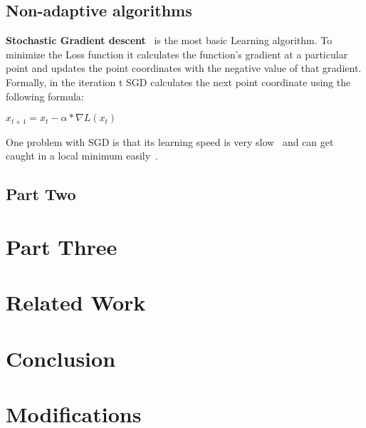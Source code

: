 \documentclass[sigconf]{acmart}
\begin{document}
\subsection{Non-adaptive algorithms}
\textbf{Stochastic Gradient descent}~\cite{kiefer1952} is the most basic Learning algorithm. To minimize the Loss function it calculates the function's gradient at a particular point and updates the point coordinates with the negative value of that gradient.
Formally, in the iteration t SGD calculates the next point coordinate using the following formula:
\begin{center}
    $x_{t+1} = x_t -\alpha * \nabla L(x_t)$
\end{center}
One problem with SGD is that its learning speed is very slow~\cite{SGDSlow} and can get caught in a local minimum easily~\cite{SGDLocalMinimum}.



\subsection{Part Two}

\lipsum[3-4]

\section{Part Three}

\lipsum[5-6]

\section{Related Work}

\section{Conclusion}

\section{Modifications}










\appendix
\end{document}
